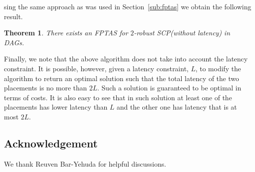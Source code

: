 \documentclass[11pt]{article}
\newtheorem{theorem}{Theorem}
\newcommand{\scp}{\textsc{SCP}\xspace}
\begin{document}
sing the same approach as was used in Section~\ref{sub:fptas} we
obtain the following result.

\begin{theorem}
There exists an FPTAS for $2$-robust \scp (without latency) in DAGs.
\end{theorem}

Finally, we note that the above algorithm does not take into account
the latency constraint.  It is possible, however, given a latency
constraint, $L$, to modify the algorithm to return an optimal solution
such that the total latency of the two placements is no more than
$2L$.  Such a solution is guaranteed to be optimal in terms of costs.
It is also easy to see that in such solution at least one of the
placements has lower latency than $L$ and the other one has latency
that is at most $2L$.






\subsection*{Acknowledgement}

We thank Reuven Bar-Yehuda for helpful discussions.




\end{document}
